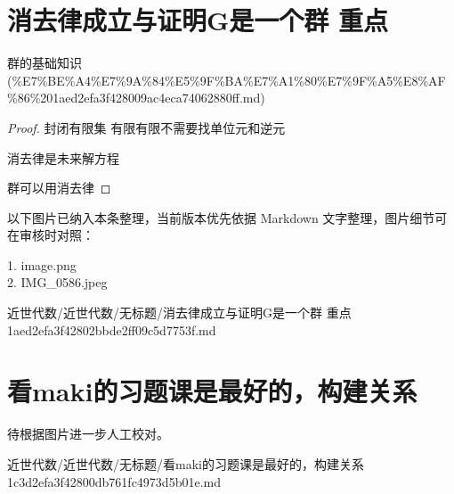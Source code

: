 \section*{消去律成立与证明G是一个群 重点}

\begin{note}[来源上级主题]

群的基础知识 (\%E7\%BE\%A4\%E7\%9A\%84\%E5\%9F\%BA\%E7\%A1\%80\%E7\%9F\%A5\%E8\%AF\%86\%201aed2efa3f428009ac4eca74062880ff.md)

\end{note}

\begin{proof}

封闭有限集 有限有限不需要找单位元和逆元

消去律是未来解方程

群可以用消去律

\end{proof}

\begin{note}[关联图片]
以下图片已纳入本条整理，当前版本优先依据 Markdown 文字整理，图片细节可在审核时对照：

1. image.png\\
2. IMG\_0586.jpeg\\

\end{note}

\begin{note}[来源路径]

近世代数/近世代数/无标题/消去律成立与证明G是一个群 重点 1aed2efa3f42802bbde2ff09c5d7753f.md

\end{note}

\section*{看maki的习题课是最好的，构建关系}

\begin{note}

待根据图片进一步人工校对。

\end{note}

\begin{note}[来源路径]

近世代数/近世代数/无标题/看maki的习题课是最好的，构建关系 1c3d2efa3f42800db761fc4973d5b01e.md

\end{note}

